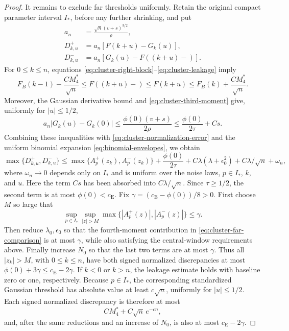 \documentclass[aop]{imsart}
\theoremstyle{plain}
\theoremstyle{definition}
\theoremstyle{definition}
\newcommand{\ce}{c_{\mathrm E}}
\begin{document}
\begin{proof}
It remains to exclude far thresholds uniformly. Retain the original
compact parameter interval $I_*$, before any further shrinking, and put
\[
\begin{aligned}
 a_n&=\frac{\sqrt n(v+s)^{3/2}}{\rho},\\
 D^+_{k,u}&=a_n[F(k+u)-G_k(u)],\\
 D^-_{k,u}&=a_n[G_k(u)-F((k+u)-)].
\end{aligned}
\]
For $0\le k\le n$, equations
\eqref{eq:cluster-right-block}--\eqref{eq:cluster-leakage} imply
\[
 F_B(k-1)-\frac{CM_4^*}{\sqrt n}
 \le F((k+u)-)\le F(k+u)
 \le F_B(k)+\frac{CM_4^*}{\sqrt n}.
\]
Moreover, the Gaussian derivative bound and
\eqref{eq:cluster-third-moment} give, uniformly for $|u|\le1/2$,
\[
 a_n|G_k(u)-G_k(0)|
 \le\frac{\phi(0)(v+s)}{2\rho}
 \le\frac{\phi(0)}{2\tau}+Cs.
\]
Combining these inequalities with
\eqref{eq:cluster-normalization-error} and the uniform binomial
expansion \eqref{eq:binomial-envelopes}, we obtain
\begin{equation}\label{eq:cluster-far-comparison}
 \max\{D^+_{k,u},D^-_{k,u}\}
 \le \max\{A_p^+(z_k),A_p^-(z_k)\}
       +\frac{\phi(0)}{2\tau}
       +C\lambda(\lambda+\epsilon_0^2)
       +C\lambda/\sqrt n+\omega_n,
\end{equation}
where $\omega_n\to0$ depends only on $I_*$ and is uniform over the
noise laws, $p\in I_*$, $k$, and $u$. Here the term $Cs$ has been
absorbed into $C\lambda/\sqrt n$.
Since $\tau\ge1/2$, the second term is at most $\phi(0)<\ce$.
Fix $\gamma=(\ce-\phi(0))/8>0$. First choose $M$ so large that
\[
 \sup_{p\in I_*}\sup_{|z|>M}
 \max\{|A_p^+(z)|,|A_p^-(z)|\}\le\gamma.
\]
Then reduce $\lambda_0,\epsilon_0$ so that the fourth-moment
contribution in \eqref{eq:cluster-far-comparison} is at most $\gamma$,
while also satisfying the central-window requirements above.
Finally increase $N_0$ so that the last two terms are at most
$\gamma$. Thus all $|z_k|>M$, with $0\le k\le n$, have both signed
normalized discrepancies at most $\phi(0)+3\gamma\le\ce-2\gamma$.
If $k<0$ or $k>n$, the leakage estimate holds with baseline zero or
one, respectively. Because $p\in I_*$, the corresponding standardized
Gaussian threshold has absolute value at least $c\sqrt n$, uniformly
for $|u|\le1/2$. Each signed normalized discrepancy is therefore at
most
\[
 CM_4^*+C\sqrt n\,e^{-cn},
\]
and, after the same reductions and an increase of $N_0$, is also at
most $\ce-2\gamma$.


\end{proof}
\end{document}
